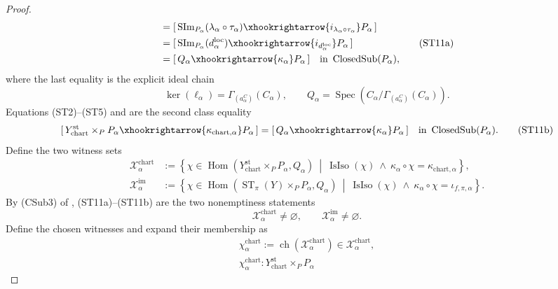 \begin{proof}
\[\begin{aligned}
      &=[\,\operatorname{SIm}_{P_\alpha}
          (\lambda_\alpha\circ\tau_\alpha)
        \xhookrightarrow{i_{\lambda_\alpha\circ\tau_\alpha}}P_\alpha\,]\\
      &=[\,\operatorname{SIm}_{P_\alpha}(d^{\mathrm{loc}}_\alpha)
        \xhookrightarrow{i_{d^{\mathrm{loc}}_\alpha}}P_\alpha\,]\\
      &=[\,Q_\alpha\xhookrightarrow{\kappa_\alpha}P_\alpha\,]
      \quad\text{in }\operatorname{ClosedSub}(P_\alpha),
  \end{aligned}                                                    \tag{ST11a}
  \]
  where the last equality is the explicit ideal chain
  \[
    \ker(\ell_\alpha)
      =\Gamma_{(a^C_\alpha)}(C_\alpha),
    \qquad
    Q_\alpha
      =\operatorname{Spec}\!\left(
        C_\alpha/\Gamma_{(a^C_\alpha)}(C_\alpha)\right).
  \]
  Equations (ST2)--(ST5) and
   are the second class
  equality
  \[
    [\,Y^{\mathrm{st}}_{\mathrm{chart}}\times_PP_\alpha
      \xhookrightarrow{\kappa_{\mathrm{chart},\alpha}}P_\alpha\,]
      =[\,Q_\alpha\xhookrightarrow{\kappa_\alpha}P_\alpha\,]
      \quad\text{in }\operatorname{ClosedSub}(P_\alpha).       \tag{ST11b}
  \]
  Define the two witness sets
  \[
  \begin{aligned}
    \mathscr X^{\mathrm{chart}}_\alpha
      &:=\left\{\chi\in
        \operatorname{Hom}(Y^{\mathrm{st}}_{\mathrm{chart}}
          \times_PP_\alpha,Q_\alpha)
        \ \middle|\ 
        \operatorname{IsIso}(\chi)\ \wedge\
        \kappa_\alpha\circ\chi=\kappa_{\mathrm{chart},\alpha}\right\},\\
    \mathscr X^{\mathrm{im}}_\alpha
      &:=\left\{\chi\in
        \operatorname{Hom}(\operatorname{ST}_\pi(Y)
          \times_PP_\alpha,Q_\alpha)
        \ \middle|\ 
        \operatorname{IsIso}(\chi)\ \wedge\
        \kappa_\alpha\circ\chi=\iota_{f,\pi,\alpha}\right\}.
  \end{aligned}
  \]
  By (CSub3) of , (ST11a)--(ST11b)
  are the two nonemptiness statements
  \[
    \mathscr X^{\mathrm{chart}}_\alpha\ne\varnothing,
    \qquad
    \mathscr X^{\mathrm{im}}_\alpha\ne\varnothing.
  \]
  Define the chosen witnesses and expand their membership as
  \[
  \begin{gathered}
    \chi^{\mathrm{chart}}_\alpha
      :=\operatorname{ch}(\mathscr X^{\mathrm{chart}}_\alpha)
      \in\mathscr X^{\mathrm{chart}}_\alpha,\\
    \chi^{\mathrm{chart}}_\alpha\colon
      Y^{\mathrm{st}}_{\mathrm{chart}}\times_PP_\alpha

\end{gathered}\]
\end{proof}
